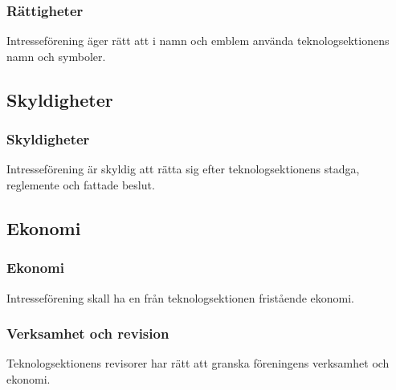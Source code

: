 \subsubsection{Rättigheter}
Intresseförening äger rätt att i namn och emblem använda teknologsektionens namn och symboler.

\subsection{Skyldigheter}

\subsubsection{Skyldigheter}
Intresseförening är skyldig att rätta sig efter teknologsektionens stadga, reglemente och fattade beslut.

\subsection{Ekonomi}

\subsubsection{Ekonomi}
Intresseförening skall ha en från teknologsektionen fristående ekonomi.

\subsubsection{Verksamhet och revision}
Teknologsektionens revisorer har rätt att granska föreningens verksamhet och ekonomi.